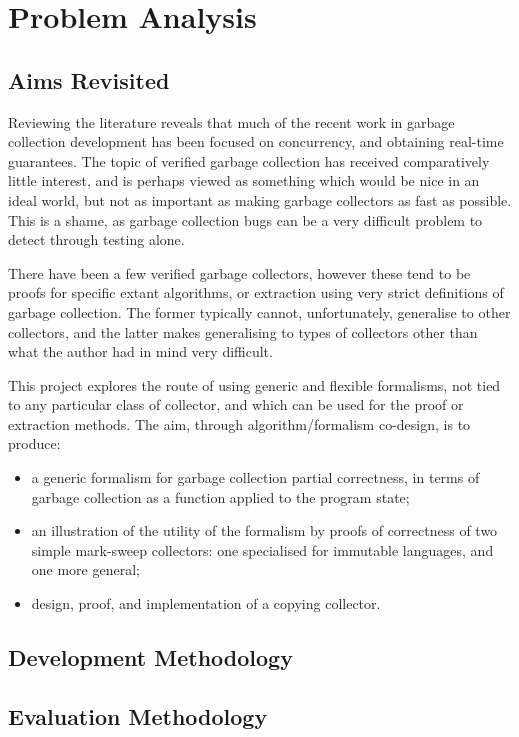 \chapter{Problem Analysis}

\section{Aims Revisited}

Reviewing the literature reveals that much of the recent work in
garbage collection development has been focused on concurrency, and
obtaining real-time guarantees. The topic of verified garbage
collection has received comparatively little interest, and is perhaps
viewed as something which would be nice in an ideal world, but not as
important as making garbage collectors as fast as possible. This is a
shame, as garbage collection bugs can be a very difficult problem to
detect through testing alone.

There have been a few verified garbage collectors, however these tend
to be proofs for specific extant algorithms, or extraction using very
strict definitions of garbage collection. The former typically cannot,
unfortunately, generalise to other collectors, and the latter makes
generalising to types of collectors other than what the author had in
mind very difficult.

This project explores the route of using generic and flexible
formalisms, not tied to any particular class of collector, and which
can be used for the proof or extraction methods. The aim, through
algorithm/formalism co-design, is to produce:

\begin{itemize}
  \item a generic formalism for garbage collection partial
    correctness, in terms of garbage collection as a function applied
    to the program state;

  \item an illustration of the utility of the formalism by proofs of
    correctness of two simple mark-sweep collectors: one specialised
    for immutable languages, and one more general;

  \item design, proof, and implementation of a copying collector.
\end{itemize}

\section{Development Methodology}


\section{Evaluation Methodology}

